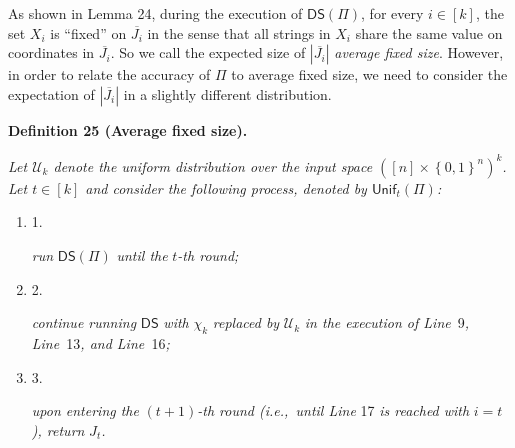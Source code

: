 As shown in Lemma 24, during the execution of $\mathsf{DS}(\Pi)$, for every $i\in[k]$, the set $X_{i}$ is “fixed” on $\overline{J_{i}}$ in the sense that all strings in $X_{i}$ share the same value on coordinates in $\overline{J_{i}}$. So we call the expected size of $|\overline{J_{i}}|$ \emph{average fixed size}. However, in order to relate the accuracy of $\Pi$ to average fixed size, we need to consider the expectation of $|\overline{J_{i}}|$ in a slightly different distribution.\par





\par\medskip\noindent\textbf{
\textbf{Definition 25}\textbf{ }(Average fixed size)\textbf{.}
}\par



\emph{Let $\mathcal{U}_{k}$ denote the uniform distribution over the input space $([n]\times\left\{0,1\right\}^{n})^{k}$.
Let $t\in[k]$ and consider the following process, denoted by $\mathsf{Unif}_{t}(\Pi)$:}\par


\begin{enumerate}


\item[] 
1. 


\emph{run }$\mathsf{DS}(\Pi)$\emph{ until the }$t$\emph{-th round;}\par





\item[] 
2. 


\emph{continue running }$\mathsf{DS}$\emph{ with }$\chi_{k}$\emph{ replaced by }$\mathcal{U}_{k}$\emph{ in the execution of Line }9\emph{, Line }13\emph{, and Line }16\emph{;}\par





\item[] 
3. 


\emph{upon entering the }$(t+1)$\emph{-th round (i.e., until Line }17\emph{ is reached with }$i=t$\emph{), return }$J_{t}$\emph{.}\par





\end{enumerate}


